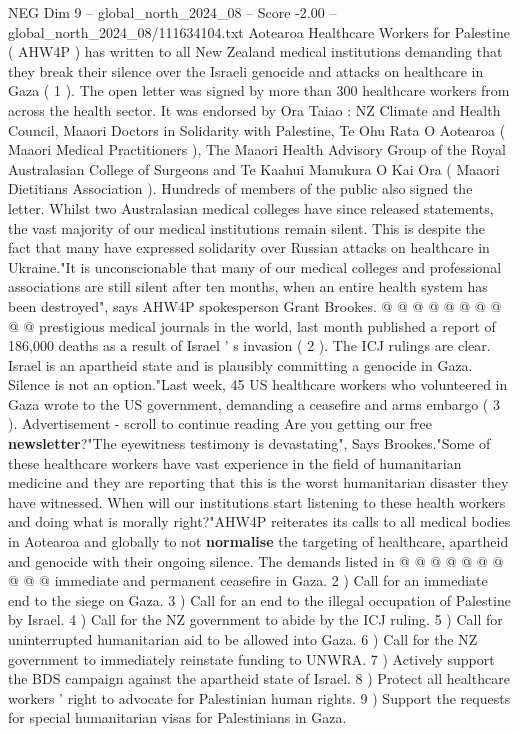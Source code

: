 \begin{textsample}{NEG Dim 9 – global\_north\_2024\_08 – Score -2.00 – global\_north\_2024\_08/111634104.txt}  \label{ex:f9_neg_259}
Aotearoa Healthcare Workers for Palestine ( AHW4P ) has written to all New Zealand medical institutions demanding that they break their silence over the Israeli genocide and attacks on healthcare in Gaza ( 1 ).
The open letter was signed by more than 300 healthcare workers from across the health sector.
It was endorsed by Ora Taiao : NZ Climate and Health Council, Maaori Doctors in Solidarity with Palestine, Te Ohu Rata O Aotearoa ( Maaori Medical Practitioners ), The Maaori Health Advisory Group of the Royal Australasian College of Surgeons and Te Kaahui Manukura O Kai Ora ( Maaori Dietitians Association ).
Hundreds of members of the public also signed the letter.
Whilst two Australasian medical colleges have since released statements, the vast majority of our medical institutions remain silent.
This is despite the fact that many have expressed solidarity over Russian attacks on healthcare in Ukraine."It is unconscionable that many of our medical colleges and professional associations are still silent after ten months, when an entire health system has been destroyed", says AHW4P spokesperson Grant Brookes. @ @ @ @ @ @ @ @ @ @ prestigious medical journals in the world, last month published a report of 186,000 deaths as a result of Israel ' s invasion ( 2 ).
The ICJ rulings are clear.
Israel is an apartheid state and is plausibly committing a genocide in Gaza.
Silence is not an option."Last week, 45 US healthcare workers who volunteered in Gaza wrote to the US government, demanding a ceasefire and arms embargo ( 3 ).
Advertisement - scroll to continue reading Are you getting our free \textbf{newsletter}?"The eyewitness testimony is devastating", Says Brookes."Some of these healthcare workers have vast experience in the field of humanitarian medicine and they are reporting that this is the worst humanitarian disaster they have witnessed.
When will our institutions start listening to these health workers and doing what is morally right?"AHW4P reiterates its calls to all medical bodies in Aotearoa and globally to not \textbf{normalise} the targeting of healthcare, apartheid and genocide with their ongoing silence.
The demands listed in @ @ @ @ @ @ @ @ @ @ immediate and permanent ceasefire in Gaza. 2 ) Call for an immediate end to the siege on Gaza. 3 ) Call for an end to the illegal occupation of Palestine by Israel. 4 ) Call for the NZ government to abide by the ICJ ruling. 5 ) Call for uninterrupted humanitarian aid to be allowed into Gaza. 6 ) Call for the NZ government to immediately reinstate funding to UNWRA. 7 ) Actively support the BDS campaign against the apartheid state of Israel. 8 ) Protect all healthcare workers ' right to advocate for Palestinian human rights. 9 ) Support the requests for special humanitarian visas for Palestinians in Gaza.

\end{textsample}
